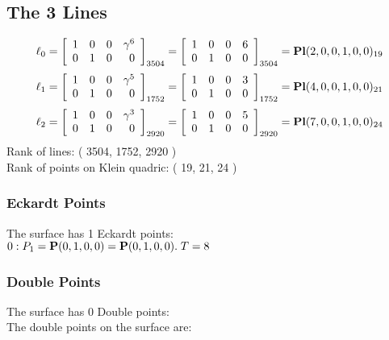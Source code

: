 \documentclass{article}
\newcommand{\bP}{{\bf P}}
\begin{document}
{\subsection*{The 3 Lines}
$$
\ell_{0} = 
\left[
\begin{array}{*{4}{r}}
1 & 0 & 0 & \gamma^{6}\\
0 & 1 & 0 & 0\\
\end{array}
\right]
_{3504}
=
\left[
\begin{array}{*{4}c}
1  & 0  & 0  & 6\\
0  & 1  & 0  & 0\\
\end{array}
\right]_{3504}
={\rm\bf Pl}(2,0,0,1,0,0 )_{19}$$
$$
\ell_{1} = 
\left[
\begin{array}{*{4}{r}}
1 & 0 & 0 & \gamma^{5}\\
0 & 1 & 0 & 0\\
\end{array}
\right]
_{1752}
=
\left[
\begin{array}{*{4}c}
1  & 0  & 0  & 3\\
0  & 1  & 0  & 0\\
\end{array}
\right]_{1752}
={\rm\bf Pl}(4,0,0,1,0,0 )_{21}$$
$$
\ell_{2} = 
\left[
\begin{array}{*{4}{r}}
1 & 0 & 0 & \gamma^{3}\\
0 & 1 & 0 & 0\\
\end{array}
\right]
_{2920}
=
\left[
\begin{array}{*{4}c}
1  & 0  & 0  & 5\\
0  & 1  & 0  & 0\\
\end{array}
\right]_{2920}
={\rm\bf Pl}(7,0,0,1,0,0 )_{24}$$
Rank of lines: ( 3504, 1752, 2920 )\\
Rank of points on Klein quadric: ( 19, 21, 24 )\\
\subsubsection*{Eckardt Points}
The surface has 1 Eckardt points:\\
$0 : P_{1}=\bP(0, 1, 0, 0) = \bP(0, 1, 0, 0).\; T= 8$\\
\subsubsection*{Double Points}
The surface has 0 Double points:\\
The double points on the surface are:\\
\begin{multicols}{2}
\noindent
\end{multicols}
}
\end{document}
